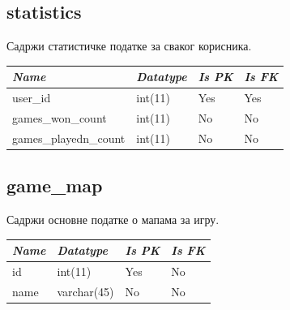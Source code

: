 \subsection{statistics}
Садржи статистичке податке за сваког корисника.

\begin{table}[h!]
\centering
\small

    \begin{tabular}{ | m{} | m{} | m{} | m{} | }
    \hline
        \cellcolor{blue!25}\textbf{\textit{Name}} &

        \cellcolor{blue!25}\textbf{\textit{Datatype}} &
        \cellcolor{blue!25}\textbf{\textit{Is PK}} &
        \cellcolor{blue!25}\textbf{\textit{Is FK}} \\
    \hline
    \hline
        user\_id & int(11) & Yes & Yes \\
    \hline
        games\_won\_count & int(11) & No & No \\
    \hline
        games\_playedn\_count & int(11) & No & No \\
    \hline
    \end{tabular}

\end{table}

\newpage

\subsection{game\_map}
Садржи основне податке о мапама за игру.

\begin{table}[h!]
\centering
\small

    \begin{tabular}{ | m{} | m{} | m{} | m{} | }
    \hline
        \cellcolor{blue!25}\textbf{\textit{Name}} &

        \cellcolor{blue!25}\textbf{\textit{Datatype}} &
        \cellcolor{blue!25}\textbf{\textit{Is PK}} &
        \cellcolor{blue!25}\textbf{\textit{Is FK}} \\
    \hline
    \hline
        id & int(11) & Yes & No \\
    \hline
        name & varchar(45) & No & No \\
    \hline
    \end{tabular}

\end{table}

